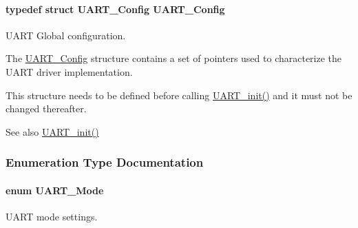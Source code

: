 \paragraph[{U\+A\+R\+T\+\_\+\+Config}]{\setlength{\rightskip}{0pt plus 5cm}typedef struct {\bf U\+A\+R\+T\+\_\+\+Config}  {\bf U\+A\+R\+T\+\_\+\+Config}}\label{_u_a_r_t_8h_ae513322c7d3184d66173cba9349989a4}


U\+A\+R\+T Global configuration. 

The \hyperlink{struct_u_a_r_t___config}{U\+A\+R\+T\+\_\+\+Config} structure contains a set of pointers used to characterize the U\+A\+R\+T driver implementation.

This structure needs to be defined before calling \hyperlink{_u_a_r_t_8h_ab60a36f7295d704926120d22f806dcd1}{U\+A\+R\+T\+\_\+init()} and it must not be changed thereafter.

\begin{DoxySeeAlso}{See also}
\hyperlink{_u_a_r_t_8h_ab60a36f7295d704926120d22f806dcd1}{U\+A\+R\+T\+\_\+init()} 
\end{DoxySeeAlso}


\subsubsection{Enumeration Type Documentation}
\paragraph[{U\+A\+R\+T\+\_\+\+Mode}]{\setlength{\rightskip}{0pt plus 5cm}enum {\bf U\+A\+R\+T\+\_\+\+Mode}}\label{_u_a_r_t_8h_a2507a620dba95cd20885c52494d19e90}


U\+A\+R\+T mode settings. 

